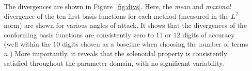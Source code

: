 \documentclass[onecolumn, twoside, a4paper, 11pt]{article}
\begin{document}
The divergences are shown in Figure~\ref{fig:divs}. Here, the \emph{mean} and \emph{maximal}
divergence of the ten first basis functions for each method (measured in the $L^2$-norm) are shown
for various angles of attack. It shows that the divergences of the conforming basis functions are
consistently zero to $11$ or $12$ digits of accuracy (well within the $10$ digits chosen as a
baseline when choosing the number of terms $n$.) More importantly, it reveals that the solenoidal
property is consistently satisfied throughout the parameter domain, with no significant variability.

\begin{figure}
  \begin{center}
     \\
\end{center}
\end{figure}
\end{document}
